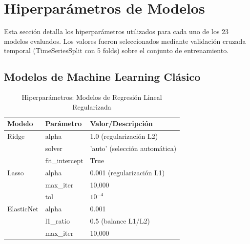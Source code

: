 
\section{Hiperpar\'ametros de Modelos}
\label{app:hyperparameters}

Esta secci\'on detalla los hiperpar\'ametros utilizados para cada uno de los 23 modelos evaluados. Los valores fueron seleccionados mediante validaci\'on cruzada temporal (TimeSeriesSplit con 5 folds) sobre el conjunto de entrenamiento.

\subsection{Modelos de Machine Learning Cl\'asico}
\label{app:ml_hyperparams}

\begin{table}[htbp]
\centering
\caption{Hiperpar\'ametros: Modelos de Regresi\'on Lineal Regularizada}
\label{tab:hyper_linear}
\small
\begin{tabular}{@{}llp{8cm}@{}}
\toprule
\textbf{Modelo} & \textbf{Par\'ametro} & \textbf{Valor/Descripci\'on} \\
\midrule
Ridge & alpha & 1.0 (regularizaci\'on L2) \\
 & solver & 'auto' (selecci\'on autom\'atica) \\
 & fit\_intercept & True \\
\midrule
Lasso & alpha & 0.001 (regularizaci\'on L1) \\
 & max\_iter & 10,000 \\
 & tol & $10^{-4}$ \\
\midrule
ElasticNet & alpha & 0.001 \\
 & l1\_ratio & 0.5 (balance L1/L2) \\
 & max\_iter & 10,000 \\
\bottomrule
\end{tabular}
\end{table}

